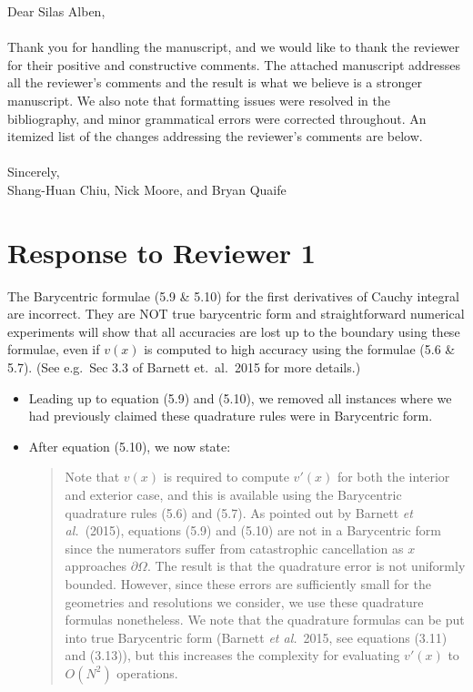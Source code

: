 \documentclass[11pt]{article}
\newcommand{\comment}[1]{{\color{blue} #1}}
\begin{document}
\noindent
Dear Silas Alben,
\\ \\
\noindent
Thank you for handling the manuscript, and we would like to thank the
reviewer for their positive and constructive comments.  The attached
manuscript addresses all the reviewer's comments and the result is what
we believe is a stronger manuscript.  We also note that formatting
issues were resolved in the bibliography, and minor grammatical errors
were corrected throughout. An itemized list of the changes addressing
the reviewer's comments are below.
\\ \\
\noindent
Sincerely,
\\
\noindent
Shang-Huan Chiu, Nick Moore, and Bryan Quaife

\section*{Response to Reviewer 1}

\noindent
\comment{The Barycentric formulae (5.9 \& 5.10) for the first
derivatives of Cauchy integral are incorrect. They are NOT true
barycentric form and straightforward numerical experiments will show
that all accuracies are lost up to the boundary using these formulae,
even if $v(x)$ is computed to high accuracy using the formulae (5.6 \&
5.7). (See e.g.~Sec 3.3 of Barnett et.~al.~2015 for more details.)}
\begin{itemize}
  \item Leading up to equation (5.9) and (5.10), we removed all
    instances where we had previously claimed these quadrature rules
    were in Barycentric form.

  \item After equation (5.10), we now state:
    \begin{quotation}
      \noindent
      Note that $v(x)$ is required to compute $v'(x)$ for both the
      interior and exterior case, and this is available using the
      Barycentric quadrature rules (5.6) and (5.7). As pointed out by
      Barnett {\em et al.}~(2015), equations (5.9) and (5.10) are not in
      a Barycentric form since the numerators suffer from catastrophic
      cancellation as $x$ approaches $\partial\Omega$. The result is
      that the quadrature error is not uniformly bounded. However, since
      these errors are sufficiently small for the geometries and
      resolutions we consider, we use these quadrature formulas
      nonetheless. We note that the quadrature formulas can be put into
      true Barycentric form (Barnett {\em et al.}~2015, see equations
      (3.11) and (3.13)), but this increases the complexity for
      evaluating $v'(x)$ to $O(N^2)$ operations. 
    \end{quotation}

\end{itemize}
\end{document}
